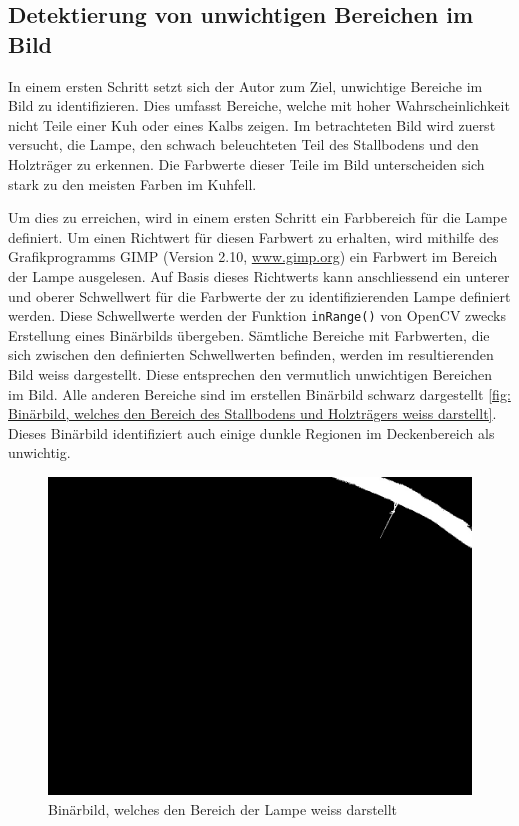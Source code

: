\subsection{Detektierung von unwichtigen Bereichen im Bild}
In einem ersten Schritt setzt sich der Autor zum Ziel, unwichtige Bereiche im Bild zu identifizieren. Dies umfasst Bereiche, welche mit hoher Wahrscheinlichkeit nicht Teile einer Kuh oder eines Kalbs zeigen. Im betrachteten Bild wird zuerst versucht, die Lampe, den schwach beleuchteten Teil des Stallbodens und den Holzträger zu erkennen. Die Farbwerte dieser Teile im Bild unterscheiden sich stark zu den meisten Farben im Kuhfell.

Um dies zu erreichen, wird in einem ersten Schritt ein Farbbereich für die Lampe definiert. Um einen Richtwert für diesen Farbwert zu erhalten, wird mithilfe des Grafikprogramms GIMP (Version 2.10, \url{www.gimp.org}) ein Farbwert im Bereich der Lampe ausgelesen. Auf Basis dieses Richtwerts kann anschliessend ein unterer und oberer Schwellwert für die Farbwerte der zu identifizierenden Lampe definiert werden. Diese Schwellwerte werden der Funktion \texttt{inRange()} von OpenCV zwecks Erstellung eines Binärbilds übergeben. Sämtliche Bereiche mit Farbwerten, die sich zwischen den definierten Schwellwerten befinden, werden im resultierenden Bild weiss dargestellt. Diese entsprechen den vermutlich unwichtigen Bereichen im Bild. Alle anderen Bereiche sind im erstellen Binärbild schwarz dargestellt \ref{fig: Binärbild, welches den Bereich des Stallbodens und Holzträgers weiss darstellt}. Dieses Binärbild identifiziert auch einige dunkle Regionen im Deckenbereich als unwichtig.

\begin{figure}[H]
	\center
	\includegraphics[scale=0.43]{Grafiken/entwicklung/3binBildLampe.jpg}
	\caption{Binärbild, welches den Bereich der Lampe weiss darstellt} 
	\label{fig: Binärbild, welches den Bereich der Lampe weiss darstellt}
\end{figure}


